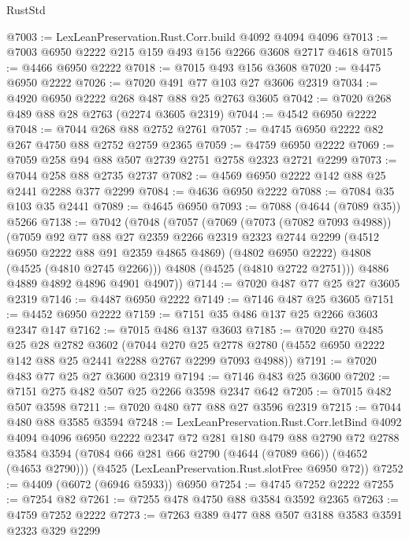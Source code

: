 \begin{lexlean}{RustStd}
\begin{coremodule}
{\begin{coremodule}
{{{{{{{{{{{{{{@7003 := LexLeanPreservation.Rust.Corr.build @4092 @4094 @4096
@7013 := @7003 @6950 @2222 @215 @159 @493 @156 @2266 @3608 @2717 @4618
@7015 := @4466 @6950 @2222
@7018 := @7015 @493 @156 @3608
@7020 := @4475 @6950 @2222
@7026 := @7020 @491 @77 @103 @27 @3606 @2319
@7034 := @4920 @6950 @2222 @268 @487 @88 @25 @2763 @3605
@7042 := @7020 @268 @489 @88 @28 @2763 (@2274 @3605 @2319)
@7044 := @4542 @6950 @2222
@7048 := @7044 @268 @88 @2752 @2761
@7057 := @4745 @6950 @2222 @82 @267 @4750 @88 @2752 @2759 @2365
@7059 := @4759 @6950 @2222
@7069 := @7059 @258 @94 @88 @507 @2739 @2751 @2758 @2323 @2721 @2299
@7073 := @7044 @258 @88 @2735 @2737
@7082 := @4569 @6950 @2222 @142 @88 @25 @2441 @2288 @377 @2299
@7084 := @4636 @6950 @2222
@7088 := @7084 @35 @103 @35 @2441
@7089 := @4645 @6950
@7093 := @7088 (@4644 (@7089 @35)) @5266
@7138 := @7042
    (@7048
      (@7057
        (@7069
          (@7073 (@7082 @7093 @4988))
          (@7059
            @92
            @77
            @88
            @27
            @2359
            @2266
            @2319
            @2323
            @2744
            @2299
            (@4512 @6950 @2222 @88 @91 @2359 @4865 @4869)
            (@4802 @6950 @2222)
            @4808
            (@4525 (@4810 @2745 @2266)))
          @4808
          (@4525 (@4810 @2722 @2751)))
        @4886
        @4889
        @4892
        @4896
        @4901
        @4907))
@7144 := @7020 @487 @77 @25 @27 @3605 @2319
@7146 := @4487 @6950 @2222
@7149 := @7146 @487 @25 @3605
@7151 := @4452 @6950 @2222
@7159 := @7151 @35 @486 @137 @25 @2266 @3603 @2347 @147
@7162 := @7015 @486 @137 @3603
@7185 := @7020
    @270
    @485
    @25
    @28
    @2782
    @3602
    (@7044
      @270
      @25
      @2778
      @2780
      (@4552 @6950 @2222 @142 @88 @25 @2441 @2288 @2767 @2299 @7093 @4988))
@7191 := @7020 @483 @77 @25 @27 @3600 @2319
@7194 := @7146 @483 @25 @3600
@7202 := @7151 @275 @482 @507 @25 @2266 @3598 @2347 @642
@7205 := @7015 @482 @507 @3598
@7211 := @7020 @480 @77 @88 @27 @3596 @2319
@7215 := @7044 @480 @88 @3585 @3594
@7248 := LexLeanPreservation.Rust.Corr.letBind
    @4092
    @4094
    @4096
    @6950
    @2222
    @2347
    @72
    @281
    @180
    @479
    @88
    @2790
    @72
    @2788
    @3584
    @3594
    (@7084 @66 @281 @66 @2790 (@4644 (@7089 @66)) (@4652 (@4653 @2790)))
    (@4525 (LexLeanPreservation.Rust.slotFree @6950 @72))
@7252 := @4409 (@6072 (@6946 @5933)) @6950
@7254 := @4745 @7252 @2222
@7255 := @7254 @82
@7261 := @7255 @478 @4750 @88 @3584 @3592 @2365
@7263 := @4759 @7252 @2222
@7273 := @7263 @389 @477 @88 @507 @3188 @3583 @3591 @2323 @329 @2299
}}}}}}}}}}}}}}
\end{coremodule}}
\end{coremodule}
\end{lexlean}
